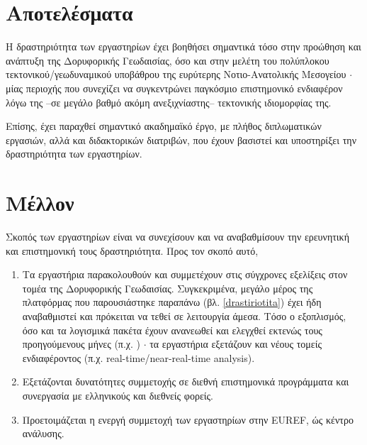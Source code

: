 \documentclass[11pt]{article}
\begin{document}
\section{Αποτελέσματα}
Η δραστηριότητα των εργαστηρίων έχει βοηθήσει σημαντικά τόσο στην προώθηση και ανάπτυξη της Δορυφορικής Γεωδαισίας, όσο και στην μελέτη του πολύπλοκου τεκτονικού/γεωδυναμικού υποβάθρου της ευρύτερης Νοτιο-Ανατολικής Μεσογείου $\cdot$ μίας περιοχής που συνεχίζει να συγκεντρώνει παγκόσμιο επιστημονικό ενδιαφέρον λόγω της --σε μεγάλο βαθμό ακόμη ανεξιχνίαστης-- τεκτονικής ιδιομορφίας της.

Επίσης, έχει παραχθεί σημαντικό ακαδημαϊκό έργο, με πλήθος διπλωματικών εργασιών, αλλά και διδακτορικών διατριβών, που έχουν βασιστεί και υποστηρίξει την δραστηριότητα των εργαστηρίων.

\section{Μέλλον}
Σκοπός των εργαστηρίων είναι να συνεχίσουν και να αναβαθμίσουν την ερευνητική και επιστημονική τους δραστηριότητα. Προς τον σκοπό αυτό,
\begin{enumerate}
\item Τα εργαστήρια παρακολουθούν και συμμετέχουν στις σύγχρονες εξελίξεις στον τομέα της Δορυφορικής Γεωδαισίας. Συγκεκριμένα, μεγάλο μέρος της πλατφόρμας που παρουσιάστηκε παραπάνω (βλ. \ref{drastiriotita}) έχει ήδη αναβαθμιστεί και πρόκειται να τεθεί σε λειτουργία άμεσα. Τόσο ο εξοπλισμός, όσο και τα λογισμικά πακέτα έχουν ανανεωθεί και ελεγχθεί εκτενώς τους προηγούμενους μήνες (π.χ. \cite{mitseuref}) $\cdot$ τα εργαστήρια εξετάζουν και νέους τομείς ενδιαφέροντος (π.χ. real-time/near-real-time analysis).
\item Εξετάζονται δυνατότητες συμμετοχής σε διεθνή επιστημονικά προγράμματα και συνεργασία με ελληνικούς και διεθνείς φορείς.
\item Προετοιμάζεται η ενεργή συμμετοχή των εργαστηρίων στην EUREF, ώς κέντρο ανάλυσης.
\end{enumerate}
\end{document}
